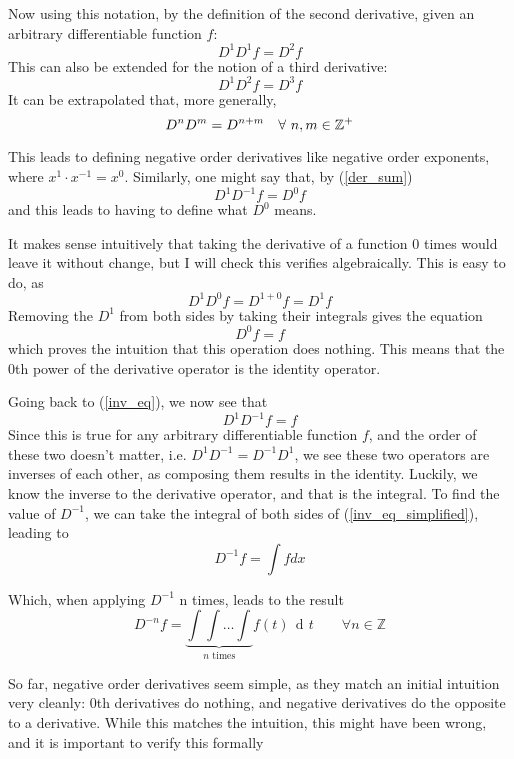 \documentclass{article}
\def\squad{\hskip2\fontdimen3\font}
\DeclareMathOperator{\di}{\,d\!}
\begin{document}
Now using this notation, by the definition of the second derivative, given an
arbitrary differentiable function $f$: $$D^1D^1 f = D^2 f$$ This can also be
extended for the notion of a third derivative: $$D^1D^2 f = D^3 f$$ It can be
extrapolated that, more generally,
\begin{equation}
	\label{der_sum}
	D^nD^m = D^{n+m} \quad \forall \squad n,m \in \mathbb{Z}^{+}
\end{equation}

This leads to defining negative order derivatives like negative order
exponents, where $x^1 \cdot x^{-1}= x^0$. Similarly, one might say that, by
(\ref{der_sum})
\begin{equation}
	\label{inv_eq}
	D^1D^{-1} f = D^0 f
\end{equation}
and this leads to having to define what $D^0$ means.

It makes sense intuitively that taking the derivative of a function 0 times
would leave it without change, but I will check this verifies
algebraically. This is easy to do, as $$D^1 D^0 f = D^{1+0} f = D^1 f$$
Removing the $D^1$ from both sides by taking their integrals gives the equation
$$D^0 f = f$$ which proves the intuition that this operation does nothing. This
means that the 0th power of the derivative operator is the identity operator.

Going back to (\ref{inv_eq}), we now see that
\begin{equation}
	\label{inv_eq_simplified}
	D^1D^{-1} f = f
\end{equation}
Since this is true for any arbitrary differentiable function $f$, and the order
of these two doesn't matter, i.e. $D^1D^{-1}=D^{-1}D^1$, we see these two
operators are inverses of each other, as composing them results in the
identity. Luckily, we know the inverse to the derivative operator, and that is
the integral. To find the value of $D^{-1}$, we can take the integral of both
sides of (\ref{inv_eq_simplified}), leading to
$$
D^{-1} f = \int f dx
$$

Which, when applying $D^{-1}$ n times, leads to the result
$$
D^{-n} f = \underbrace{\int \int \ldots \int}_\text{$n$ times}
		   f\left(t\right) \di t \qquad \forall n \in \mathbb{Z}
$$

So far, negative order derivatives seem simple, as they match an initial
intuition very cleanly: 0th derivatives do nothing, and negative derivatives do
the opposite to a derivative. While this matches the intuition, this might have
been wrong, and it is important to verify this formally
\end{document}
